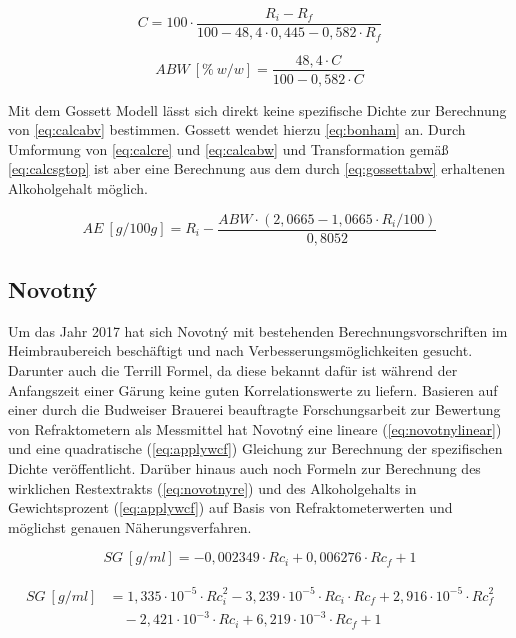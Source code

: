 \documentclass[a4paper,parskip=half]{scrartcl}
\newcommand{\bxi}{\mathit{R}_i}
\newcommand{\bxic}{\mathit{Rc}_i}
\newcommand{\bxf}{\mathit{R}_f}
\newcommand{\bxfc}{\mathit{Rc}_f}
\newcommand{\sg}{\mathit{SG}}
\newcommand{\abw}{\mathit{ABW}}
\newcommand{\aex}{\mathit{AE}}
\begin{document}
\begin{equation}
C = 100 \cdot \frac{\bxi - \bxf}{100 - 48,4 \cdot 0,445 - 0,582 \cdot \bxf}
\label{eq:gossett} 
\end{equation}

\begin{equation}
\abw\:[\%\:w/w] = \frac{48,4 \cdot C}{100 - 0,582 \cdot C}
\label{eq:gossettabw} 
\end{equation}

Mit dem Gossett Modell lässt sich direkt keine spezifische Dichte
zur Berechnung von \autoref{eq:calcabv} bestimmen. Gossett wendet
hierzu \autoref{eq:bonham} an. Durch Umformung von
\autoref{eq:calcre} und \autoref{eq:calcabw} und Transformation gemäß
\autoref{eq:calcsgtop} ist aber eine Berechnung aus dem
durch \autoref{eq:gossettabw} erhaltenen Alkoholgehalt möglich.

\begin{equation}
\aex\:[g/100g] = \bxi - \frac{\abw \cdot (2,0665 - 1,0665 \cdot \bxi / 100)}{0,8052}
\end{equation}

\subsection*{Novotný}

Um das Jahr 2017 hat sich Novotný mit bestehenden Berechnungsvorschriften
im Heimbraubereich beschäftigt und nach Verbesserungsmöglichkeiten
gesucht. Darunter auch die Terrill Formel, da diese bekannt dafür
ist während der Anfangszeit einer Gärung keine guten Korrelationswerte
zu liefern. Basieren auf einer durch die Budweiser Brauerei beauftragte Forschungsarbeit zur Bewertung von Refraktometern als Messmittel
hat Novotný eine lineare (\autoref{eq:novotnylinear}) und eine quadratische
(\autoref{eq:applywcf}) Gleichung zur Berechnung der spezifischen
Dichte veröffentlicht. Darüber hinaus auch noch Formeln zur
Berechnung des wirklichen Restextrakts (\autoref{eq:novotnyre}) und
des Alkoholgehalts in Gewichtsprozent (\autoref{eq:applywcf}) auf Basis
von Refraktometerwerten und möglichst genauen Näherungsverfahren. \autocite{Novotny2017a,Novotny2017,Savel2009}

\begin{equation} 
\sg\:[g/ml] = -0,002349 \cdot \bxic + 0,006276 \cdot \bxfc + 1
\label{eq:novotnylinear} 
\end{equation}

\begin{align}
\begin{split}
\sg\:[g/ml] &= 1,335 \cdot 10^{-5} \cdot \bxic^2 - 3,239 \cdot 10^{-5} \cdot \bxic \cdot \bxfc + 2,916 \cdot 10^{-5} \cdot \bxfc^2 \\
& \quad - 2,421 \cdot 10^{-3} \cdot \bxic + 6,219 \cdot 10^{-3} \cdot \bxfc + 1
\end{split} \label{eq:novotnyquadratic} 
\end{align}
\end{document}
